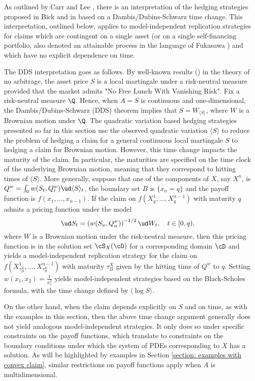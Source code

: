 \documentclass[11pt]{article}
\begin{document}
\begin{remark}[DDS]
As outlined by Carr and Lee \cite{Carr-Lee:semimartingales}, there is an interpretation of the hedging strategies proposed in Bick \cite{Bick} and in \cite{Carr-Lee:semimartingales} based on a Dambis/Dubins-Schwarz time change. This interpretation, outlined below, applies to model-independent replication strategies for claims which are contingent on a single asset (or on a single self-financing portfolio, also denoted an attainable process in the language of Fukasawa \cite{Fukasawa}) and which have no explicit dependence on time.

The DDS interpretation goes as follows. By well-known results (\cite{Delbaen-Schachermayer, Harrison:1981}) in the theory of no arbitrage, the asset price $S$ is a local martingale under a risk-neutral measure provided that the market admits "No Free Lunch With Vanishing Risk". Fix a risk-neutral measure $\Q$. Hence, when $A = S$ is continuous and one-dimensional, the Dambis/Dubins-Schwarz (DDS) theorem implies that $S = W_{\langle S \rangle}$, where $W$ is a Brownian motion under $\Q$. The quadratic variation based hedging strategies presented so far in this section use the observed quadratic variation $\langle S \rangle$ to reduce the problem of hedging a claim for a general continuous local martingale $S$ to hedging a claim for Brownian motion. However, this time change impacts the maturity of the claim. In particular, the maturities are specified on the time clock of the underlying Brownian motion, meaning that they correspond to hitting times of $\langle S \rangle$. More generally, suppose that one of the components of $X$, say $X^n$, is $Q^w_\cdot = \int_0^\cdot w(S_t, Q^w_t) \ud \langle S \rangle_t$, the boundary set $B$ is $\{x_n = q\}$ and the payoff function is $f(x_1,\ldots,x_{n-1})$. If the claim on $f(X^1_q,\ldots,X^{n-1}_q)$ with maturity $q$ admits a pricing function under the model 
$$
\ud S_t = \left( w(S_u, Q^w_u) \right)^{-1/2} \ud W_t, \quad t \in [0,q),
$$
where $W$ is a Brownian motion under the risk-neutral measure, then this pricing function is in the solution set $\cS_X(\cD)$ for a corresponding domain $\cD$ and yields a model-independent replication strategy for the claim on $f(X^1_{\tau^X_B},\ldots,X^{n-1}_{\tau^X_B})$ with maturity $\tau^X_B$ given by the hitting time of $Q^w$ to $q$. Setting $w(x_1,x_2) = \frac{1}{x_1^2}$ yields model-independent strategies based on the Black-Scholes formula, with the time change defined by $\langle \log S \rangle$.

On the other hand, when the claim depends explicitly on $S$ and on time, as with the examples in this section, then the above time change argument generally does not yield analogous model-independent strategies. It only does so under specific constraints on the payoff functions, which translate to constraints on the boundary conditions under which the system of PDEs corresponding to $X$ has a solution. As will be highlighted by examples in Section \ref{section: examples with convex claim}, similar restrictions on payoff functions apply when $A$ is multidimensional.
\end{remark}
\end{document}
